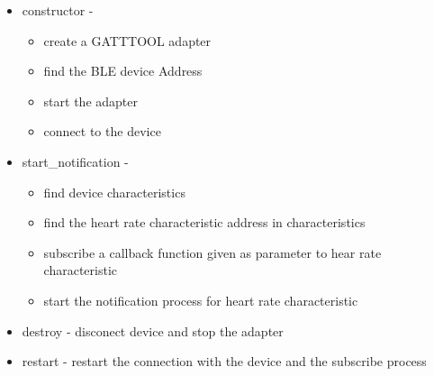 \begin{itemize}
    \item constructor -
        \begin{itemize}
            \item create a GATTTOOL adapter
            \item find the BLE device Address
            \item start the adapter
            \item connect to the device
        \end{itemize}
    \item start_notification -
        \begin{itemize}
            \item find device characteristics
            \item find the heart rate characteristic address in characteristics
            \item subscribe a callback function given as parameter to hear rate characteristic
            \item start the notification process for heart rate characteristic
        \end{itemize}
    \item destroy - disconect device and stop the adapter
    \item restart - restart the connection with the device and the subscribe process
\end{itemize}
